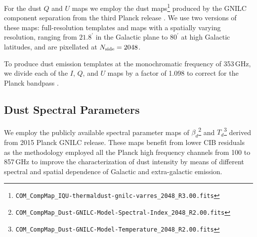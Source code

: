 For the dust $Q$ and $U$ maps we employ the dust maps\footnote{\texttt{COM\_CompMap\_IQU-thermaldust-gnilc-varres\_2048\_R3.00.fits}} produced by the GNILC component separation from the third Planck release \citep{planck2016-l04,planck2016-l11B}. We use two versions of these maps: full-resolution templates and maps with a spatially varying resolution, ranging from $21.8^\prime$ in the Galactic plane to $80^\prime$ at high Galactic latitudes, and are pixellated at $N_{\rm side} = 2048$. 


To produce dust emission templates at the monochromatic frequency of 353\,GHz, we divide each of the $I$, $Q$, and $U$ maps by a factor of 1.098 to correct for the Planck bandpass \citep[][Table~2]{planck2016-l11A}.



\subsection{Dust Spectral Parameters}
We employ the publicly available spectral parameter maps of $\beta_d$\footnote {\texttt{COM\_CompMap\_Dust-GNILC-Model-Spectral-Index\_2048\_R2.00.fits}} and $T_d$\footnote{\texttt{COM\_CompMap\_Dust-GNILC-Model-Temperature\_2048\_R2.00.fits}} derived from 2015 Planck GNILC release. These maps benefit from lower CIB residuals as the methodology employed all the Planck high frequency channels from 100 to 857\,GHz to improve the characterization of dust intensity by means of different spectral and spatial dependence of Galactic and extra-galactic emission. 


